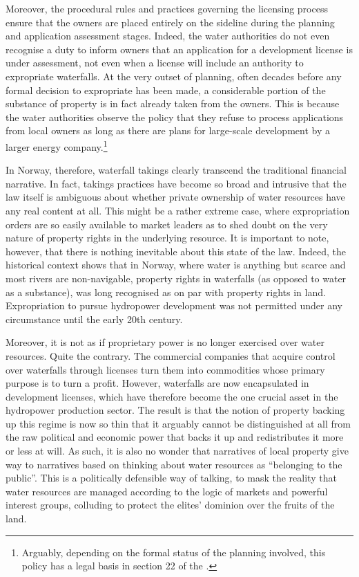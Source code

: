 Moreover, the procedural rules and practices governing the licensing process ensure that the owners are placed entirely on the sideline during the planning and application assessment stages. Indeed, the water authorities do not even recognise a duty to inform owners that an application for a development license is under assessment, not even when a license will include an authority to expropriate waterfalls. At the very outset of planning, often decades before any formal decision to expropriate has been made, a considerable portion of the substance of property is in fact already taken from the owners. This is because the water authorities observe the policy that they refuse to process applications from local owners as long as there are plans for large-scale development by a larger energy company.\footnote{Arguably, depending on the formal status of the planning involved, this policy has a legal basis in section 22 of the \cite{wra00}.} 

In Norway, therefore, waterfall takings clearly transcend the traditional financial narrative. In fact, takings practices have become so broad and intrusive that the law itself is ambiguous about whether private ownership of water resources have any real content at all. This might be a rather extreme case, where expropriation orders are so easily available to market leaders as to shed doubt on the very nature of property rights in the underlying resource. It is important to note, however, that there is nothing inevitable about this state of the law. Indeed, the historical context shows that in Norway, where water is anything but scarce and most rivers are non-navigable, property rights in waterfalls (as opposed to water as a substance), was long recognised as on par with property rights in land. Expropriation to pursue hydropower development was not permitted under any circumstance until the early 20th century. 

Moreover, it is not as if proprietary power is no longer exercised over water resources. Quite the contrary. The commercial companies that acquire control over waterfalls through licenses turn them into commodities whose primary purpose is to turn a profit. However, waterfalls are now encapsulated in development licenses, which have therefore become the one crucial asset in the hydropower production sector. The result is that the notion of property backing up this regime is now so thin that it arguably cannot be distinguished at all from the raw political and economic power that backs it up and redistributes it more or less at will. As such, it is also no wonder that narratives of local property give way to narratives based on thinking about water resources as ``belonging to the public''. This is a politically defensible way of talking, to mask the reality that water resources are managed according to the logic of markets and powerful interest groups, colluding to protect the elites' dominion over the fruits of the land.

